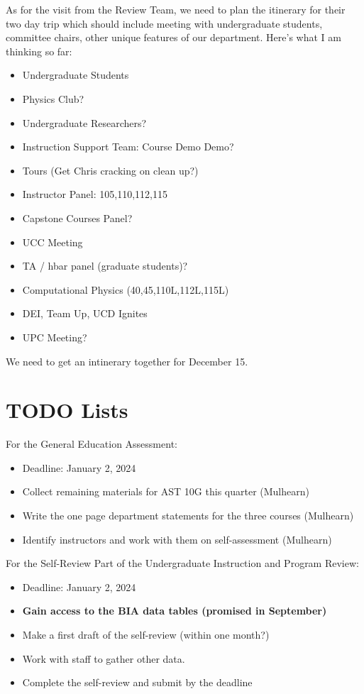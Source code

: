 \documentclass[12pt]{article}
\begin{document}
As for the visit from the Review Team, we need to plan the itinerary for their two day trip which should include meeting with undergraduate students, committee chairs, other unique features of our department.  Here's what I am thinking so far:
\begin{itemize}
\item Undergraduate Students
\item Physics Club?
\item Undergraduate Researchers?
\item Instruction Support Team:  Course Demo Demo?
\item Tours (Get Chris cracking on clean up?)
\item Instructor Panel: 105,110,112,115
\item Capstone Courses Panel?
\item UCC Meeting
\item TA / hbar panel (graduate students)?
\item Computational Physics (40,45,110L,112L,115L)
\item DEI, Team Up, UCD Ignites
\item UPC Meeting?
\end{itemize}
We need to get an intinerary together for December 15.

\section{TODO Lists}

\noindent
For the General Education Assessment:
\begin{itemize}
\item Deadline:  January 2, 2024
\item Collect remaining materials for AST 10G this quarter (Mulhearn)
\item Write the one page department statements for the three courses (Mulhearn)
\item Identify instructors and work with them on self-assessment (Mulhearn)
\end{itemize}

\noindent
For the Self-Review Part of the Undergraduate Instruction and Program Review:
\begin{itemize}
\item Deadline:  January 2, 2024  
\item {\bf Gain access to the BIA data tables (promised in September)}
\item Make a first draft of the self-review (within one month?)
\item Work with staff to gather other data.
\item Complete the self-review and submit by the deadline
\end{itemize}
\end{document}

